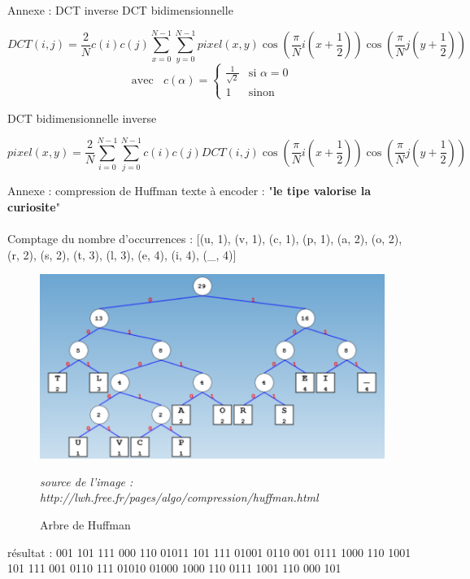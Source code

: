 \documentclass[xcolor=dvipsnames]{beamer}
\begin{document}
\begin{frame}{Annexe : DCT inverse}        
    \scriptsize
    \centering
    DCT bidimensionnelle
    
    \[
    DCT(i,j) = \frac{2}{N} c(i) c(j) \sum_{x=0}^{N-1} \sum_{y=0}^{N-1} pixel(x,y) \cos \left( \frac{\pi}{N} i \left( x + \frac{1}{2} \right) \right) \cos \left( \frac{\pi}{N} j \left( y + \frac{1}{2} \right) \right)
    \]
    \[
        \text{avec} \ \ \ \ c(\alpha) =
        \begin{cases}
        \frac{1}{\sqrt{2}} & \text{si } \alpha = 0 \\
        1 & \text{sinon}
        \end{cases}
    \]
    
    \vspace{1cm} %

    DCT bidimensionnelle inverse
    
    \[
        pixel(x,y) = \frac{2}{N} \sum_{i=0}^{N-1} \sum_{j=0}^{N-1} c(i) c(j) DCT(i,j) \cos \left( \frac{\pi}{N} i \left( x + \frac{1}{2} \right) \right) \cos \left( \frac{\pi}{N} j \left( y + \frac{1}{2} \right) \right)
    \]
\end{frame}

\begin{frame} {Annexe : compression de Huffman}
    \footnotesize
    texte à encoder : "\textbf{le tipe valorise la curiosite}"
    \\ \ \\
    Comptage du nombre d'occurrences : [(u, 1), (v, 1), (c, 1), (p, 1), (a, 2), (o, 2), (r, 2), (s, 2), (t, 3), (l, 3), (e, 4), (i, 4), (\_, 4)]

    \begin{figure}
        \centering
        \includegraphics[width=0.5\linewidth]{compressionhuffman.png}
        \caption{Arbre de Huffman}
        \tiny \textit{source de l'image : http://lwh.free.fr/pages/algo/compression/huffman.html}
    \end{figure}

    résultat : 001 101 111 000 110 01011 101 111 01001 0110 001 0111 1000 110 1001 101 111 001 0110 111 01010 01000 1000 110 0111 1001 110 000 101

\end{frame}
\end{document}
